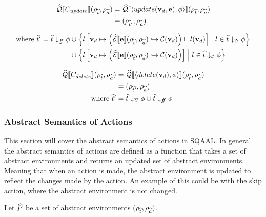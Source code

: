 \begin{align}
    \widehat{\mathcal{Q}}\llbracket C_{update} \rrbracket(\rho_{\widehat{t}}, \rho_{\widehat{a}})
                                              & = \widehat{\mathcal{Q}}\llbracket \langle update(\mathbf{v}_d, \mathbf{e}), \phi \rangle \rrbracket (\rho_{\widehat{t}}, \rho_{\widehat{a}}) \\
                                              & = (\rho_{\widehat{t}'}, \rho_{\widehat{a}})
\end{align}

\begin{align}
    \text{where } \widehat{t}' = \widehat{t} \downarrow_{f\!\!f} \phi
    & \cup \left\{ l\left[ \mathbf{v}_d \mapsto \left( \widehat{\mathcal{E}}\llbracket \mathbf{e} \rrbracket(\rho_{\widehat{t}}, \rho_{\widehat{a}}) \hookrightarrow \mathcal{C}(\mathbf{v}_d) \right) \sqcup l(\mathbf{v}_d) \right] \;\middle|\; l \in \widehat{t} \downarrow_{?\!?} \phi \right\} \\
    & \cup \left\{ l\left[ \mathbf{v}_d \mapsto \left( \widehat{\mathcal{E}}\llbracket \mathbf{e} \rrbracket(\rho_{\widehat{t}}, \rho_{\widehat{a}}) \hookrightarrow \mathcal{C}(\mathbf{v}_d) \right) \right] \;\middle|\; l \in \widehat{t} \downarrow_{t\!t} \phi \right\}
\end{align}

\begin{align*}
    \widehat{\mathcal{Q}}\llbracket C_{delete} \rrbracket(\rho_{\widehat{t}}, \rho_{\widehat{a}})
    &= \widehat{\mathcal{Q}}\llbracket \langle delete(\mathbf{v}_d), \phi \rangle \rrbracket (\rho_{\widehat{t}}, \rho_{\widehat{a}}) \\
    &= (\rho_{\widehat{t}'}, \rho_{\widehat{a}}) \\
    \text{where } \widehat{t}' &= \widehat{t} \downarrow_{?\!?} \phi \cup \widehat{t} \downarrow_{f\!\!f} \phi
\end{align*}

\subsubsection{Abstract Semantics of Actions}
This section will cover the abstract semantics of actions in SQAAL.
In general the abstract semantics of actions are defined as a function that takes a set of abstract environments and returns an updated set of abstract environments.
Meaning that when an action is made, the abstract environment is updated to reflect the changes made by the action.
An example of this could be with the skip action, where the abstract environment is not changed.


Let $\widehat{P}$ be a set of abstract environments $(\rho_{\widehat{t}}, \rho_{\widehat{a}})$.

